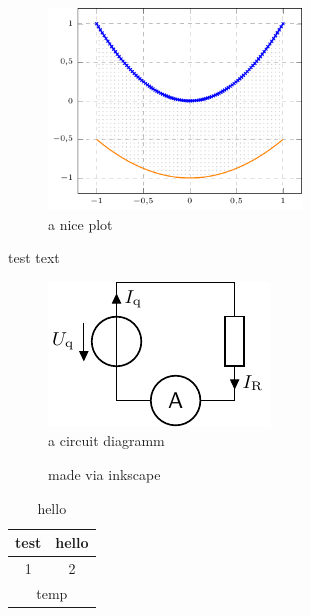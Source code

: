 \documentclass[todos,f1]{HsH-report}
\begin{document}
	\pagebreak
	\begin{figure}
		\centering
		\includegraphics[width=0.6\textwidth, page=2]{plt/examplePlot.pdf}
		\caption{a nice plot }
	\end{figure}

	test text

	\begin{figure}
		\centering
		\includegraphics{crc/exampleCircuit.pdf}
		\caption{a circuit diagramm}
	\end{figure}

	\makeatletter

	\begin{figure}
		\graphicspath{{svg/}} %
		
		\caption{made via inkscape}
	\end{figure}

	\begin{table}
		\caption{hello}
		\begin{tabular}{c|c}
			test & hello \\\hline\hline
			1 & 2 \\
			\multicolumn{2}{|c|}{temp}
		\end{tabular}
	\end{table}

\printbibliography
\listoffigures
\end{document}
